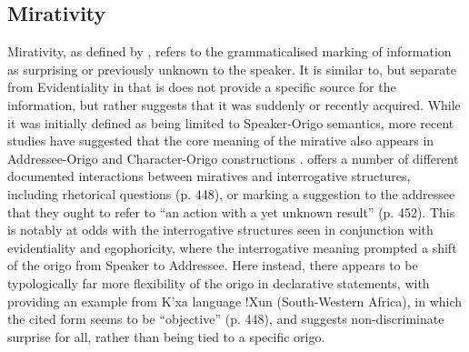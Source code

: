 \subsection{Mirativity}\label{s:Intro:MirativityIntro}
Mirativity, as defined by , refers to the grammaticalised marking of information as surprising or previously unknown to the speaker. It is similar to, but separate from Evidentiality in that is does not provide a specific source for the information, but rather suggests that it was suddenly or recently acquired. While it was initially defined as being limited to Speaker-Origo semantics, more recent studies have suggested that the core meaning of the mirative also appears in Addressee-Origo and Character-Origo constructions \cites{HengeveldOlbertz2012}{Aikhenvald2012Mirative}.  offers a number of different documented interactions between miratives and interrogative structures, including rhetorical questions (p. 448), or marking a suggestion to the addressee that they ought to refer to ``an action with a yet unknown result'' (p. 452). This is notably at odds with the interrogative structures seen in conjunction with evidentiality and egophoricity, where the interrogative meaning prompted a shift of the origo from Speaker to Addressee. Here instead, there appears to be typologically far more flexibility of the origo in declarative statements, with  providing an example from K'xa language !Xun (South-Western Africa), in which the cited form seems to be ``objective'' (p. 448), and suggests non-discriminate surprise for all, rather than being tied to a specific origo.

